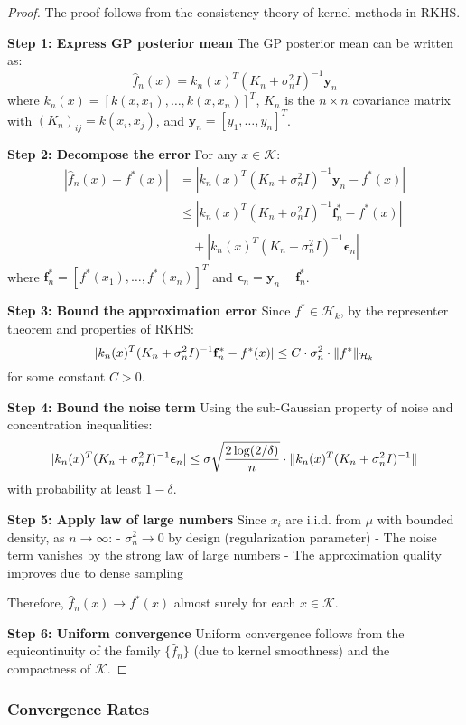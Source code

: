 \begin{proof}
The proof follows from the consistency theory of kernel methods in RKHS. 

\textbf{Step 1: Express GP posterior mean}
The GP posterior mean can be written as:
$$\hat{f}_n(x) = k_n(x)^T (K_n + \sigma_n^2 I)^{-1} \mathbf{y}_n$$
where $k_n(x) = [k(x, x_1), \ldots, k(x, x_n)]^T$, $K_n$ is the $n \times n$ covariance matrix with $(K_n)_{ij} = k(x_i, x_j)$, and $\mathbf{y}_n = [y_1, \ldots, y_n]^T$.

\textbf{Step 2: Decompose the error}
For any $x \in \mathcal{K}$:
\begin{align}
|\hat{f}_n(x) - f^*(x)| &= |k_n(x)^T (K_n + \sigma_n^2 I)^{-1} \mathbf{y}_n - f^*(x)| \\
&\leq |k_n(x)^T (K_n + \sigma_n^2 I)^{-1} \mathbf{f}_n^* - f^*(x)| \\
&\quad + |k_n(x)^T (K_n + \sigma_n^2 I)^{-1} \boldsymbol{\epsilon}_n|
\end{align}
where $\mathbf{f}_n^* = [f^*(x_1), \ldots, f^*(x_n)]^T$ and $\boldsymbol{\epsilon}_n = \mathbf{y}_n - \mathbf{f}_n^*$.

\textbf{Step 3: Bound the approximation error}
Since $f^* \in \mathcal{H}_k$, by the representer theorem and properties of RKHS:
$$|k_n(x)^T (K_n + \sigma_n^2 I)^{-1} \mathbf{f}_n^* - f^*(x)| \leq C \cdot \sigma_n^2 \cdot \lVert f^*\rVert_{\mathcal{H}_k}$$
for some constant $C > 0$.

\textbf{Step 4: Bound the noise term}
Using the sub-Gaussian property of noise and concentration inequalities:
$$|k_n(x)^T (K_n + \sigma_n^2 I)^{-1} \boldsymbol{\epsilon}_n| \leq \sigma \sqrt{\frac{2\log(2/\delta)}{n}} \cdot \lVert k_n(x)^T (K_n + \sigma_n^2 I)^{-1}\rVert$$
with probability at least $1-\delta$.

\textbf{Step 5: Apply law of large numbers}
Since $x_i$ are i.i.d. from $\mu$ with bounded density, as $n \to \infty$:
- $\sigma_n^2 \to 0$ by design (regularization parameter)
- The noise term vanishes by the strong law of large numbers
- The approximation quality improves due to dense sampling

Therefore, $\hat{f}_n(x) \to f^*(x)$ almost surely for each $x \in \mathcal{K}$.

\textbf{Step 6: Uniform convergence}
Uniform convergence follows from the equicontinuity of the family $\{\hat{f}_n\}$ (due to kernel smoothness) and the compactness of $\mathcal{K}$.
\end{proof}

\subsubsection{Convergence Rates}

